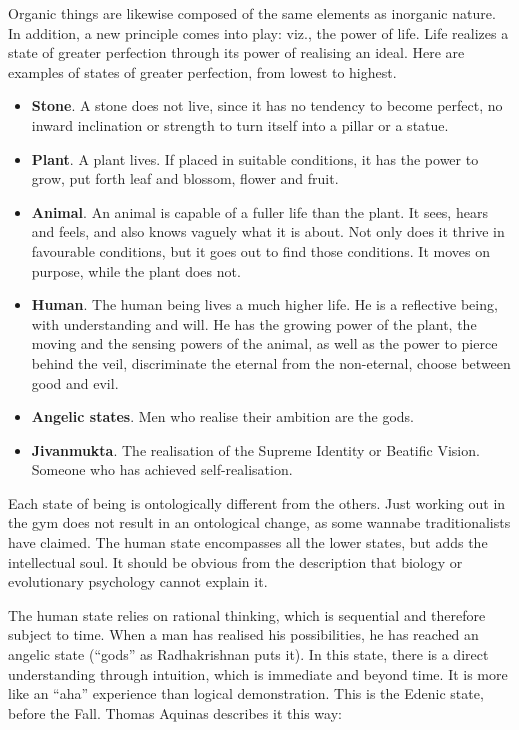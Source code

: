 Organic things are likewise composed of the same elements as inorganic nature. In addition, a new principle comes into play: viz., the power of life. Life realizes a state of greater perfection through its power of realising an ideal. Here are examples of states of greater perfection, from lowest to highest.

\begin{itemize}
\item \textbf{Stone}. A stone does not live, since it has no tendency to become perfect, no inward inclination or strength to turn itself into a pillar or a statue.
\item \textbf{Plant}. A plant lives. If placed in suitable conditions, it has the power to grow, put forth leaf and blossom, flower and fruit. 
\item \textbf{Animal}. An animal is capable of a fuller life than the plant. It sees, hears and feels, and also knows vaguely what it is about. Not only does it thrive in favourable conditions, but it goes out to find those conditions. It moves on purpose, while the plant does not. 
\item \textbf{Human}. The human being lives a much higher life. He is a reflective being, with understanding and will. He has the growing power of the plant, the moving and the sensing powers of the animal, as well as the power to pierce behind the veil, discriminate the eternal from the non-eternal, choose between good and evil. 
\item \textbf{Angelic states}. Men who realise their ambition are the gods. 
\item \textbf{Jivanmukta}. The realisation of the Supreme Identity or Beatific Vision. Someone who has achieved self-realisation. 
\end{itemize}
Each state of being is ontologically different from the others. Just working out in the gym does not result in an ontological change, as some wannabe traditionalists have claimed. The human state encompasses all the lower states, but adds the intellectual soul. It should be obvious from the description that biology or evolutionary psychology cannot explain it.

The human state relies on rational thinking, which is sequential and therefore subject to time. When a man has realised his possibilities, he has reached an angelic state (“gods” as Radhakrishnan puts it). In this state, there is a direct understanding through intuition, which is immediate and beyond time. It is more like an “aha” experience than logical demonstration. This is the Edenic state, before the Fall. Thomas Aquinas describes it this way:

